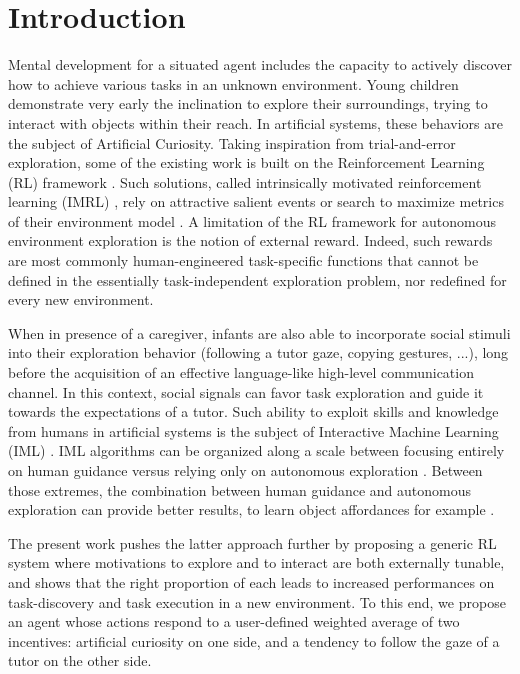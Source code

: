 \documentclass[letterpaper, 10 pt, conference]{ieeeconf}  %
\begin{document}
\section{Introduction}

Mental development for a situated agent includes the capacity to actively discover how to achieve various tasks in an unknown environment. Young children demonstrate very early the inclination to explore their surroundings, trying to interact with objects within their reach. In artificial systems, these behaviors are the subject of Artificial Curiosity. Taking inspiration from trial-and-error exploration, some of the existing work is built on the Reinforcement Learning (RL) framework \cite{sutton_reinforcement_1998}. Such solutions, called intrinsically motivated reinforcement learning (IMRL) \cite{oudeyer_what_2009}, rely on attractive salient events \cite{chentanez_intrinsically_2004} or search to maximize metrics of their environment model \cite{hester_intrinsically_2012}. A limitation of the RL framework for autonomous environment exploration is the notion of external reward. Indeed, such rewards are most commonly human-engineered task-specific functions \cite{dewey_reinforcement_2014} that cannot be defined in the essentially task-independent exploration problem, nor redefined for every new environment. 

When in presence of a caregiver, infants are also able to incorporate social stimuli into their exploration behavior (following a tutor gaze, copying gestures, ...), long before the acquisition of an effective language-like high-level communication channel. In this context, social signals can favor task exploration and guide it towards the expectations of a tutor. Such ability to exploit skills and knowledge from humans in artificial systems is the subject of Interactive Machine Learning (IML) \cite{senft_leveraging_2017}. IML algorithms can be organized along a scale between focusing entirely on human guidance \cite{fern_decision-theoretic_2014} versus relying only on autonomous exploration \cite{griffith_policy_2013}. Between those extremes, the combination between human guidance and autonomous exploration can provide better results, to learn object affordances for example \cite{chu_learning_2016}.

The present work pushes the latter approach further by proposing a generic RL system where motivations to explore and to interact are both externally tunable, and shows that the right proportion of each leads to increased performances on task-discovery and task execution in a new environment. To this end, we propose an agent whose actions respond to a user-defined weighted average of two incentives: artificial curiosity on one side, and a tendency to follow the gaze of a tutor on the other side. 
\end{document}

